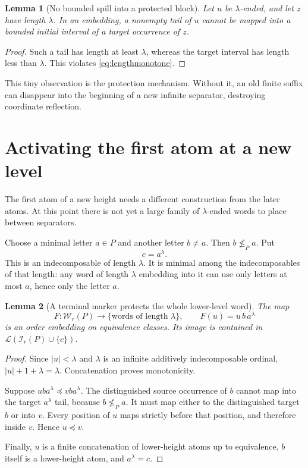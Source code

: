 \documentclass[11pt,letterpaper]{article}
\newtheorem{lemma}[lemma]{Lemma}
\theoremstyle{definition}
\theoremstyle{remark}
\newcommand{\W}{\mathcal W}
\newcommand{\I}{\mathcal I}
\newcommand{\Lcal}{\mathcal L}
\newcommand{\emb}{\preccurlyeq}
\begin{document}
\begin{lemma}[No bounded spill into a protected block]\label{lem:nospill}
Let $u$ be $\lambda$-ended, and let $z$ have length $\lambda$.
In an embedding, a nonempty tail of $u$ cannot be mapped into a bounded
initial interval of a target occurrence of $z$.
\end{lemma}

\begin{proof}
Such a tail has length at least $\lambda$, whereas the target interval
has length less than $\lambda$. This violates
\eqref{eq:lengthmonotone}.
\end{proof}

This tiny observation is the protection mechanism. Without it, an old
finite suffix can disappear into the beginning of a new infinite
separator, destroying coordinate reflection.

\section{Activating the first atom at a new level}\label{sec:activation}

The first atom of a new height needs a different construction from the
later atoms. At this point there is not yet a large family of
$\lambda$-ended words to place between separators.

Choose a minimal letter $a\in P$ and another letter $b\ne a$.
Then $b\not\le_P a$. Put
\[
  c=a^\lambda.
\]
This is an indecomposable of length $\lambda$. It is minimal among the
indecomposables of that length: any word of length $\lambda$ embedding
into it can use only letters at most $a$, hence only the letter $a$.

\begin{lemma}[A terminal marker protects the whole lower-level word]
\label{lem:marker}
The map
\begin{equation}\label{eq:marker}
  F\colon\W_r(P)\longrightarrow\{\text{words of length }\lambda\},
  \qquad F(u)=u\,b\,a^\lambda
\end{equation}
is an order embedding on equivalence classes.
Its image is contained in $\Lcal(\I_r(P)\cup\{c\})$.
\end{lemma}

\begin{proof}
Since $|u|<\lambda$ and $\lambda$ is an infinite additively indecomposable
ordinal, $|u|+1+\lambda=\lambda$. Concatenation proves monotonicity.

Suppose $u b a^\lambda\emb v b a^\lambda$. The distinguished source
occurrence of $b$ cannot map into the target $a^\lambda$ tail, because
$b\not\le_P a$. It must map either to the distinguished target $b$ or
into $v$. Every position of $u$ maps strictly before that position, and
therefore inside $v$. Hence $u\emb v$.

Finally, $u$ is a finite concatenation of lower-height atoms up to
equivalence, $b$ itself is a lower-height atom, and $a^\lambda=c$.
\end{proof}
\end{document}
